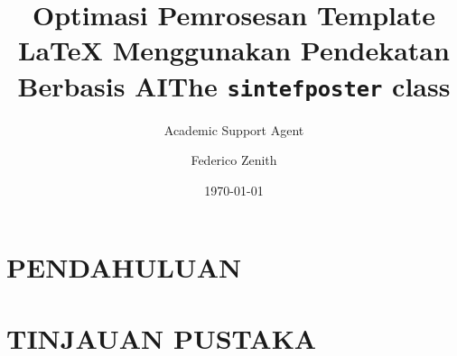 \documentclass{sintefposter}
\title{Optimasi Pemrosesan Template LaTeX Menggunakan Pendekatan Berbasis AI}
\author{Academic Support Agent}
\date{\today}
\begin{document}
\maketitle

\begin{abstract}

\end{abstract}

\chapter{PENDAHULUAN}


\chapter{TINJAUAN PUSTAKA}


\usepackage{graphicx}

\title{The \texttt{sintefposter} class}
\author{Federico Zenith}
\end{document}
